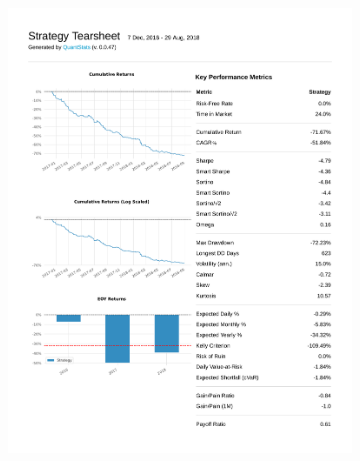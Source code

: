 \documentclass[12pt,a4paper]{article}
\begin{document}
\begin{figure}[ht!]
\begin{subfigure}[ht!]{0.45\textwidth}
    \includegraphics[page=2, width=\textwidth]{plots/qs_rand.pdf}
  \end{subfigure}
  \begin{subfigure}[ht!]{0.45\textwidth}

\end{subfigure}
\end{figure}
\end{document}
